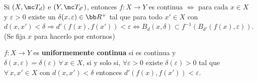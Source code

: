 \begin{obs}
    Si $(X,\mc T_d)$ e $(Y, \mc T_{d'})$, entonces $f:X \longrightarrow Y$ es continua $\iff$ para cada $x\in X$ y $\varepsilon >0$ existe un $\delta(x, \varepsilon) \in \bb R^+$ tal que para todo $x' \in X$ con $d(x,x') < \delta \Rightarrow d'(f(x),f(x'))< \varepsilon \iff B_d(x, \delta) \subset f^{-1} (B_{d'}(f(x), \varepsilon))$. 
    (Se fija $x$ para hacerlo por entornos)
\end{obs}
\begin{defi}
$f: X \longrightarrow Y$ es \textbf{uniformemente continua} si es continua y $\delta(x, \varepsilon) = \delta(\varepsilon) \, \forall \, x\in X$, si y solo si, $\forall \varepsilon >0$ existe $\delta(\varepsilon)>0$ tal que $\forall \, x, x'\in X$ con $d(x,x')< \delta$ entonces $d'(f(x),f(x'))< \varepsilon$.  
\end{defi}


